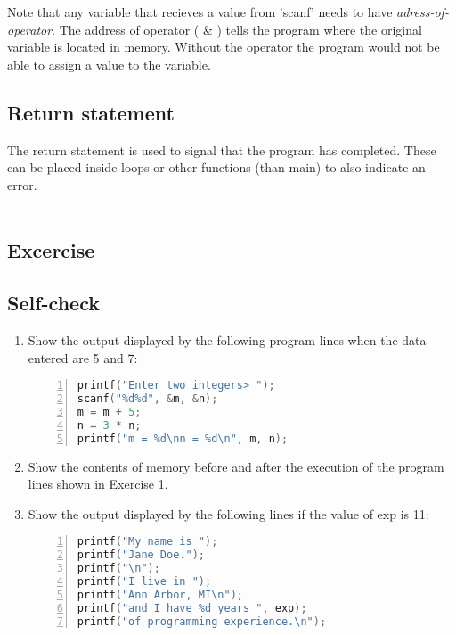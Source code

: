 \documentclass[12pt, letterpaper]{report}
\begin{document}
Note that any variable that recieves a value from 'scanf' needs to have \textit{adress-of-operator}.
The address of operator ( \& ) tells the program where the original variable is 
located in memory. Without the operator the program would not be able to assign 
a value to the variable.

\subsection*{Return statement}
The return statement is used to signal that the program has completed. These can 
be placed inside loops or other functions (than main) to also indicate an error.\\\\

\subsection{Excercise}
\subsection*{Self-check}
\begin{enumerate}
\item Show the output displayed by the following program lines when the data
	entered are 5 and 7:
\begin{lstlisting}[language=C,framexleftmargin=5mm,frame=single,xleftmargin=18pt,numbers=left,numberstyle=\tiny]
printf("Enter two integers> ");
scanf("%d%d", &m, &n);
m = m + 5;
n = 3 * n;
printf("m = %d\nn = %d\n", m, n);
\end{lstlisting}
\item Show the contents of memory before and after the execution of the program
lines shown in Exercise 1.
\item Show the output displayed by the following lines if the value of exp is 11:
\begin{lstlisting}[language=C,framexleftmargin=5mm,frame=single,xleftmargin=18pt,numbers=left,numberstyle=\tiny]
printf("My name is ");
printf("Jane Doe.");
printf("\n");
printf("I live in ");
printf("Ann Arbor, MI\n");
printf("and I have %d years ", exp);
printf("of programming experience.\n");
\end{lstlisting}
\end{enumerate}
\end{document}

